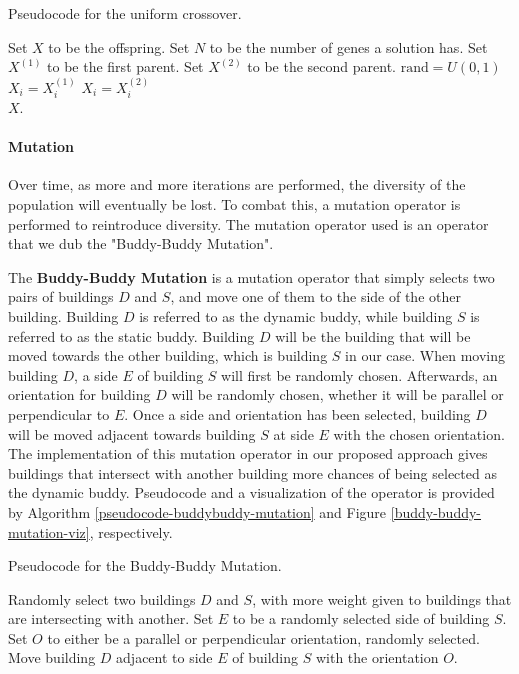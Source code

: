 \begin{algorithm}
\caption{Pseudocode for the uniform crossover.}
\label{pseudocode-uniform-crossover}
\begin{algorithmic}[1]
\State Set $X$ to be the offspring.
\State Set $N$ to be the number of genes a solution has.
\State Set $X^{(1)}$ to be the first parent.
\State Set $X^{(2)}$ to be the second parent.
	\State $\text{rand} = U(0, 1)$
		\State $X_{i} = X^{(1)}_{i}$
	\Else
		\State $X_{i} = X^{(2)}_{i}$
	\EndIf
\EndFor \\
\Return $X$.
\end{algorithmic}
\end{algorithm}

\paragraph{Mutation}
Over time, as more and more iterations are performed, the diversity of the population will eventually be lost. To combat this, a mutation operator is performed to reintroduce diversity. The mutation operator used is an operator that we dub the "Buddy-Buddy Mutation".

The \textbf{Buddy-Buddy Mutation} is a mutation operator that simply selects two pairs of buildings $D$ and $S$, and move one of them to the side of the other building. Building $D$ is referred to as the dynamic buddy, while building $S$ is referred to as the static buddy. Building $D$ will be the building that will be moved towards the other building, which is building $S$ in our case. When moving building $D$, a side $E$ of building $S$ will first be randomly chosen. Afterwards, an orientation for building $D$ will be randomly chosen, whether it will be parallel or perpendicular to $E$. Once a side and orientation has been selected, building $D$ will be moved adjacent towards building $S$ at side $E$ with the chosen orientation. The implementation of this mutation operator in our proposed approach gives buildings that intersect with another building more chances of being selected as the dynamic buddy. Pseudocode and a visualization of the operator is provided by Algorithm \ref{pseudocode-buddybuddy-mutation} and Figure \ref{buddy-buddy-mutation-viz}, respectively.

\begin{algorithm}
\caption{Pseudocode for the Buddy-Buddy Mutation.}
\label{pseudocode-buddybuddy-mutation}
\begin{algorithmic}[1]
	\State Randomly select two buildings $D$ and $S$, with more weight given to buildings that are intersecting with another.
	\State Set $E$ to be a randomly selected side of building $S$.
	\State Set $O$ to either be a parallel or perpendicular orientation, randomly selected.
	\State Move building $D$ adjacent to side $E$ of building $S$ with the orientation $O$.
\end{algorithmic}
\end{algorithm}

